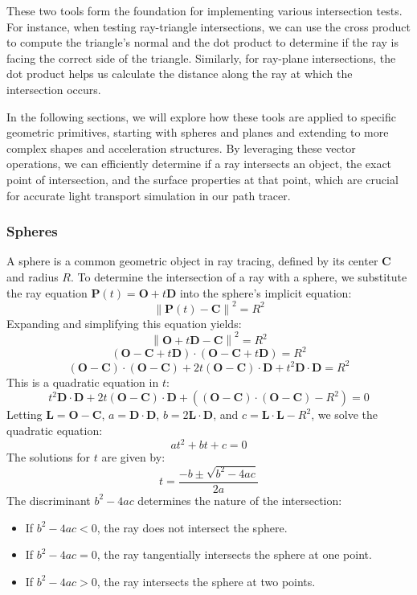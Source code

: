 \documentclass[12pt]{article}
\begin{document}
These two tools form the foundation for implementing various intersection tests. For instance, when testing ray-triangle intersections, we can use the cross product to compute the triangle's normal and the dot product to determine if the ray is facing the correct side of the triangle. Similarly, for ray-plane intersections, the dot product helps us calculate the distance along the ray at which the intersection occurs.

In the following sections, we will explore how these tools are applied to specific geometric primitives, starting with spheres and planes and extending to more complex shapes and acceleration structures. By leveraging these vector operations, we can efficiently determine if a ray intersects an object, the exact point of intersection, and the surface properties at that point, which are crucial for accurate light transport simulation in our path tracer.
\subsubsection{Spheres}

A sphere is a common geometric object in ray tracing, defined by its center \(\mathbf{C}\) and radius \(R\). To determine the intersection of a ray with a sphere, we substitute the ray equation \(\mathbf{P}(t) = \mathbf{O} + t\mathbf{D}\) into the sphere's implicit equation:
\[
    \left\| \mathbf{P}(t) - \mathbf{C} \right\|^2 = R^2
\]
Expanding and simplifying this equation yields:
\[
    \left\| \mathbf{O} + t\mathbf{D} - \mathbf{C} \right\|^2 = R^2
\]
\[
    \left( \mathbf{O} - \mathbf{C} + t\mathbf{D} \right) \cdot \left( \mathbf{O} - \mathbf{C} + t\mathbf{D} \right) = R^2
\]
\[
    (\mathbf{O} - \mathbf{C}) \cdot (\mathbf{O} - \mathbf{C}) + 2t \left( \mathbf{O} - \mathbf{C} \right) \cdot \mathbf{D} + t^2 \mathbf{D} \cdot \mathbf{D} = R^2
\]
This is a quadratic equation in \(t\):
\[
    t^2 \mathbf{D} \cdot \mathbf{D} + 2t \left( \mathbf{O} - \mathbf{C} \right) \cdot \mathbf{D} + \left( (\mathbf{O} - \mathbf{C}) \cdot (\mathbf{O} - \mathbf{C}) - R^2 \right) = 0
\]
Letting \(\mathbf{L} = \mathbf{O} - \mathbf{C}\), \(a = \mathbf{D} \cdot \mathbf{D}\), \(b = 2 \mathbf{L} \cdot \mathbf{D}\), and \(c = \mathbf{L} \cdot \mathbf{L} - R^2\), we solve the quadratic equation:
\[
    at^2 + bt + c = 0
\]
The solutions for \(t\) are given by:
\[
    t = \frac{-b \pm \sqrt{b^2 - 4ac}}{2a}
\]
The discriminant \(b^2 - 4ac\) determines the nature of the intersection:
\begin{itemize}
    \item If \(b^2 - 4ac < 0\), the ray does not intersect the sphere.
    \item If \(b^2 - 4ac = 0\), the ray tangentially intersects the sphere at one point.
    \item If \(b^2 - 4ac > 0\), the ray intersects the sphere at two points.
\end{itemize}
\end{document}
